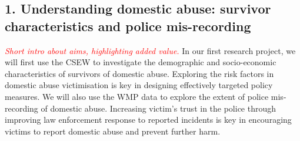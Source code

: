 \documentclass[11pt, a4paper]{article}
\begin{document}
\subsection*{1. Understanding domestic abuse: survivor characteristics and police mis-recording}

 \textcolor{red}{\textit{Short intro about aims, highlighting added value.}}
In our first research project, we will first use the CSEW to investigate the demographic and socio-economic characteristics of survivors of domestic abuse. Exploring the risk factors in domestic abuse victimisation is key in designing effectively targeted policy measures. We will also use the WMP data to explore the extent of police mis-recording of domestic abuse. Increasing victim's trust in the police through improving law enforcement response to reported incidents is key in encouraging victims to report domestic abuse and prevent further harm.



\end{document}
